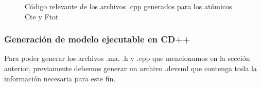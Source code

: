 \begin{figure}[!h]
\centering     %
{}
\caption{Código relevante de los archivos .cpp generados para los atómicos Cte y Ftot}
\end{figure}

\subsubsection{Generación de modelo ejecutable en CD++}
Para poder generar los archivos .ma, .h y .cpp que mencionamos en la sección anterior, previamente debemos generar un archivo .devsml que contenga toda la información necesaria para este fin.

